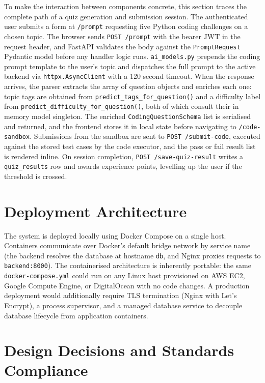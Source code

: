 To make the interaction between components concrete, this section
traces the complete path of a quiz generation and submission session.
The authenticated user submits a form at \texttt{/prompt} requesting
five Python coding challenges on a chosen topic. The browser sends
\texttt{POST /prompt} with the bearer JWT in the request header, and
FastAPI validates the body against the \texttt{PromptRequest} Pydantic
model before any handler logic runs. \texttt{ai\_models.py} prepends
the coding prompt template to the user's topic and dispatches the full
prompt to the active backend via \texttt{httpx.AsyncClient} with a 120
second timeout. When the response arrives, the parser extracts the
array of question objects and enriches each one: topic tags are
obtained from \texttt{predict\_tags\_for\_question()} and a difficulty
label from \texttt{predict\_difficulty\_for\_question()}, both of
which consult their in memory model singleton. The enriched
\texttt{CodingQuestionSchema} list is serialised and returned, and the
frontend stores it in local state before navigating to
\texttt{/code-sandbox}. Submissions from the sandbox are sent to
\texttt{POST /submit-code}, executed against the stored test cases by
the code executor, and the pass or fail result list is rendered inline.
On session completion, \texttt{POST /save-quiz-result} writes a
\texttt{quiz\_results} row and awards experience points, levelling up
the user if the threshold is crossed.

\section{Deployment Architecture}

The system is deployed locally using Docker Compose on a single host.
Containers communicate over Docker's default bridge network by service
name (the backend resolves the database at hostname \texttt{db}, and
Nginx proxies requests to \texttt{backend:8000}). The containerised
architecture is inherently portable: the same \texttt{docker-compose.yml}
could run on any Linux host provisioned on AWS EC2, Google Compute
Engine, or DigitalOcean with no code changes. A production deployment
would additionally require TLS termination (Nginx with Let's Encrypt),
a process supervisor, and a managed database service to decouple
database lifecycle from application containers.

\section{Design Decisions and Standards Compliance}

